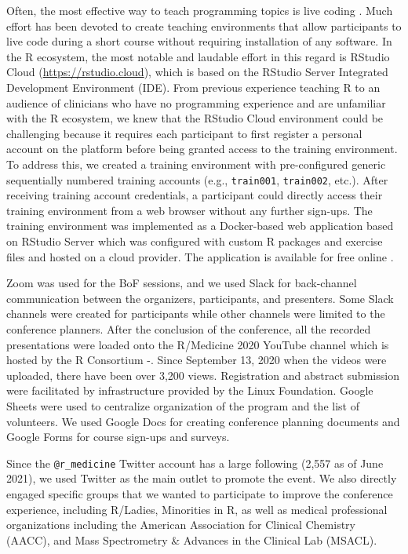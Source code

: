 Often, the most effective way to teach programming topics is live coding
\citep{Wilson2018}. Much effort has been devoted to create teaching
environments that allow participants to live code during a short course
without requiring installation of any software. In the R ecosystem, the
most notable and laudable effort in this regard is RStudio Cloud
(\url{https://rstudio.cloud}), which is based on the RStudio Server
Integrated Development Environment (IDE). From previous experience
teaching R to an audience of clinicians who have no programming
experience and are unfamiliar with the R ecosystem, we knew that the
RStudio Cloud environment could be challenging because it requires each
participant to first register a personal account on the platform before
being granted access to the training environment. To address this, we
created a training environment with pre-configured generic sequentially
numbered training accounts (e.g., \texttt{train001}, \texttt{train002},
etc.). After receiving training account credentials, a participant could
directly access their training environment from a web browser without
any further sign-ups. The training environment was implemented as a
Docker-based web application based on RStudio Server which was
configured with custom R packages and exercise files and hosted on a
cloud provider. The application is available for free online
\citep{arsptrain}.

Zoom was used for the BoF sessions, and we used Slack for back-channel
communication between the organizers, participants, and presenters. Some
Slack channels were created for participants while other channels were
limited to the conference planners. After the conclusion of the
conference, all the recorded presentations were loaded onto the
R/Medicine 2020 YouTube channel which is hosted by the R Consortium
-\citet{youtube1}. Since September 13, 2020 when the videos were
uploaded, there have been over 3,200 views. Registration and abstract
submission were facilitated by infrastructure provided by the Linux
Foundation. Google Sheets were used to centralize organization of the
program and the list of volunteers. We used Google Docs for creating
conference planning documents and Google Forms for course sign-ups and
surveys.

Since the \texttt{@r\_medicine} Twitter account has a large following
(2,557 as of June 2021), we used Twitter as the main outlet to promote
the event. We also directly engaged specific groups that we wanted to
participate to improve the conference experience, including R/Ladies,
Minorities in R, as well as medical professional organizations including
the American Association for Clinical Chemistry (AACC), and Mass
Spectrometry \& Advances in the Clinical Lab (MSACL).

